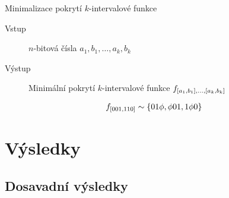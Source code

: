 \documentclass{beamer}
\theoremstyle{remark}
\begin{document}
\begin{frame}{Minimalizace pokrytí $k$-intervalové funkce}

\begin{problem}
\begin{description}
\item[Vstup]
$n$-bitová čísla
$a_1, b_1, \ldots, a_k, b_k$

\item[Výstup]
Minimální pokrytí $k$-intervalové funkce $f_{[a_1, b_1], \ldots, [a_k, b_k]}$
\end{description}
\end{problem}

\begin{example}
$$
f_{[001, 110]} \sim \{01 \phi, \phi 01, 1 \phi 0\}
$$

\begin{figure}[h]
\centering

\end{figure}
\end{example}
\end{frame}

\section{Výsledky}

\subsection{Dosavadní výsledky}
\end{document}
